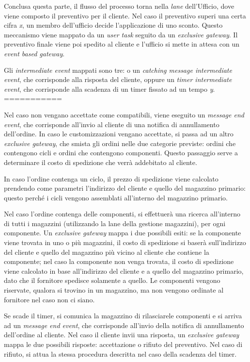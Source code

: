 Conclusa questa parte, il flusso del processo torna nella \textit{lane} dell'Ufficio, dove viene composto il preventivo per il cliente.
Nel caso il preventivo superi una certa cifra \textit{x}, un membro dell'ufficio decide l'applicazione di uno sconto. Questo meccanismo viene mappato da un \textit{user task} seguito da un \textit{exclusive gateway}. Il preventivo finale viene poi spedito al cliente e l'ufficio si mette in attesa con un \textit{event based gateway}.

Gli \textit{intermediate event} mappati
sono tre: o un \textit{catching message intermediate event}, che
corrisponde alla risposta del cliente, oppure un
\textit{timer intermediate event}, che corrisponde alla scadenza di un
timer fissato ad un tempo \textit{y}.
===========

Nel caso non vengano accettate come compatibili, viene eseguito un
\textit{message end event}, che corrisponde all'invio al cliente di una
notifica di annullamento dell'ordine.
In caso le customizzazioni vengano accettate, si passa ad un altro
\textit{exclusive gateway}, che smista gli ordini nelle due categorie
previste: ordini che contengono cicli e ordini che contengono
componenti.
Questo passaggio serve a determinare il costo di spedizione che verr\`a
addebitato al cliente.

In caso l'ordine contenga un ciclo, il prezzo di spedizione viene
calcolato prendendo come parametri l'indirizzo del cliente e quello del
magazzino primario: questo perch\'e i cicli vengono assemblati
all'interno del magazzino primario.

Nel caso l'ordine contenga delle componenti, si effettuer\`a una ricerca
\linebreak all'interno di tutti i magazzini (utilizzando la lane della gestione
magazzini), per ogni componente. Un \textit{exclusive gateway} mappa i
due possibili esiti: se la componente viene trovata in uno o pi\`u
magazzini, il costo di spedizione si baser\`a sull'indirizzo del cliente
e quello del magazzino pi\`u vicino al cliente che contiene la
componente; nel caso la componente non venga trovata, il costo di
spedizione viene calcolato in base all'indirizzo del cliente e a quello
del magazzino primario, dato che il fornitore spedisce solamente a
quello.
Le componenti vengono riservate, qualora si trovino in un magazzino, ma
non vengono ordinate al fornitore nel caso non ci siano.

Se scade il timer, si comunica la magazzino di rilasciarele componenti e
si arriva ad un \textit{message end event}, che corrisponde all'invio
della notifica di annullamento dell'ordine al cliente. Nel caso il
cliente invii una risposta, un \textit{exclusive gateway} mappa le due
possibili risposte: accettazione o rifiuto del preventivo. Nel caso di
rifiuto, si attua la stessa procedura descritta nel caso della scadenza
del timer.

